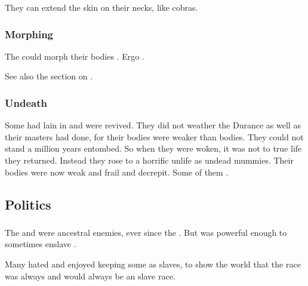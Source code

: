 They can extend the skin on their necks, like cobras. 





\subsubsection{Morphing}
The \quiljaaran could morph their bodies . 
Ergo . 

See also the section on . 





\subsubsection{Undeath}
Some \ophidians had lain in  and were revived.
They did not weather the Durance as well as their \draconian masters had done, for their \ophidian bodies were weaker than \draconian bodies.
They could not stand a million years entombed. 
So when they were woken, it was not to true life they returned.
Instead they rose to a horrific unlife as undead mummies. 
Their bodies were now weak and frail and decrepit. 
Some of them .









\subsection{Politics}





\subsubsection{\Aryothim}
The \ophidians and \aryothim were ancestral enemies, ever since the .
But  was powerful enough to sometimes enslave \aryothim. 

Many \ophidians hated \aryothim and enjoyed keeping some \aryothim as slaves, to show the world that the \aryoth race was always and would always be an \ophidian slave race. 





